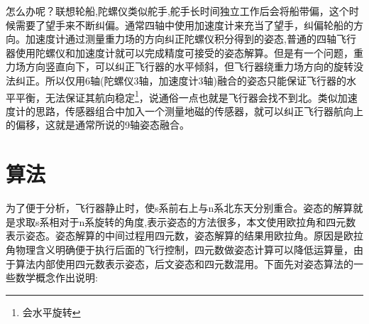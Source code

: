 \documentclass[10pt,a4paper]{article}
\renewcommand{\citep}[1]{\textsuperscript{\cite{#1}}}
\begin{document}
怎么办呢？\citep{9轴融合论文}联想轮船,陀螺仪类似舵手,舵手长时间独立工作后会将船带偏，这个时候需要了望手来不断纠偏。通常四轴中使用加速度计来充当了望手，纠偏轮船的方向。加速度计通过测量重力场的方向纠正陀螺仪积分得到的姿态,普通的四轴飞行器使用陀螺仪和加速度计就可以完成精度可接受的姿态解算。但是有一个问题，重力场方向竖直向下，可以纠正飞行器的水平倾斜，但飞行器绕重力场方向的旋转没法纠正。所以仅用6轴(陀螺仪3轴，加速度计3轴)融合的姿态只能保证飞行器的水平平衡，无法保证其航向稳定\footnote{会水平旋转}，说通俗一点也就是飞行器会找不到北。类似加速度计的思路，传感器组合中加入一个测量地磁的传感器\citep{经典博客}，就可以纠正飞行器航向上的偏移，这就是通常所说的9轴姿态融合。

\section{算法}
为了便于分析，飞行器静止时，使s系前右上与n系北东天分别重合。姿态的解算就是求取s系相对于n系旋转的角度,表示姿态的方法很多，本文使用欧拉角和四元数表示姿态。姿态解算的中间过程用四元数，姿态解算的结果用欧拉角。原因是欧拉角物理含义明确便于执行后面的飞行控制，四元数做姿态计算可以降低运算量，由于算法内部使用四元数表示姿态，后文姿态和四元数混用。下面先对姿态算法的一些数学概念作出说明:







\newpage
\renewcommand\refname{参考文献}
\centering %


\end{document}
